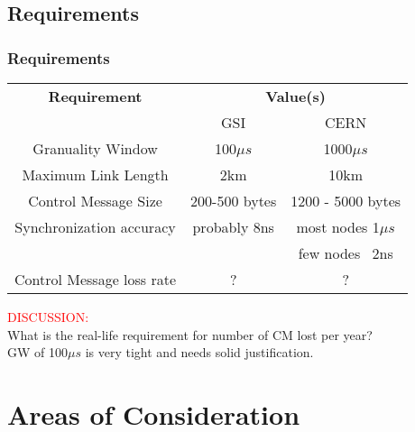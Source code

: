 \documentclass[]{beamer}
\begin{document}
\subsection{Requirements}
\begin{frame}
  \frametitle{Requirements}

\begin{table}[ht]
\centering
	\begin{tabular}{| c | c | c |}          \hline
\textbf{Requirement     }& \multicolumn{2}{|c|}{\textbf{Value(s)}}  \\
                         & GSI              & CERN          \\ \hline
Granuality Window        & 100$\mu s$       & 1000$\mu s$   \\ \hline
Maximum Link Length      & 2km              & 10km          \\ \hline
Control Message Size     & 200-500 bytes    & 1200 - 5000 bytes     \\ \hline
Synchronization accuracy & probably 8ns     & most nodes 1$\mu s$ \\
                         &                  & few nodes  ~2ns \\ \hline
Control Message loss rate&  ?               & ?                  \\ \hline

\end{tabular}
\label{tab:requirements}
\end{table}

\centering
\textcolor{red}{DISCUSSION:}\\
What is the real-life requirement for number of CM lost per year?\\
GW of 100$\mu s$ is very tight and needs solid justification.

\end{frame}

\section{Areas of Consideration}
\end{document}
